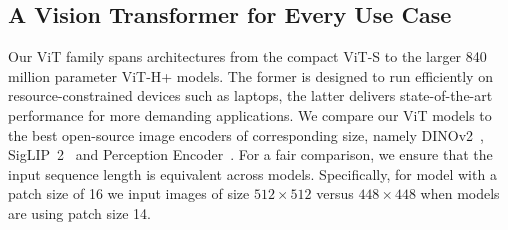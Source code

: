\subsection{A Vision Transformer for Every Use Case}
\label{sec:family:vits}
Our ViT family spans architectures from the compact ViT-S to the larger 840 million parameter ViT-H+ models.
The former is designed to run efficiently on resource-constrained devices such as laptops, the latter delivers state-of-the-art performance for more demanding applications.
We compare our ViT models to the best open-source image encoders of corresponding size, namely DINOv2~\citep{oquab2024dinov2}, SigLIP~2~\citep{tschannen2025siglip} and Perception Encoder~\citep{bolya2025perception}. 
For a fair comparison, we ensure that the input sequence length is equivalent across models. 
Specifically, for model with a patch size of 16 we input images of size $512 \times 512$ versus $448 \times 448$ when models are using patch size 14. 


